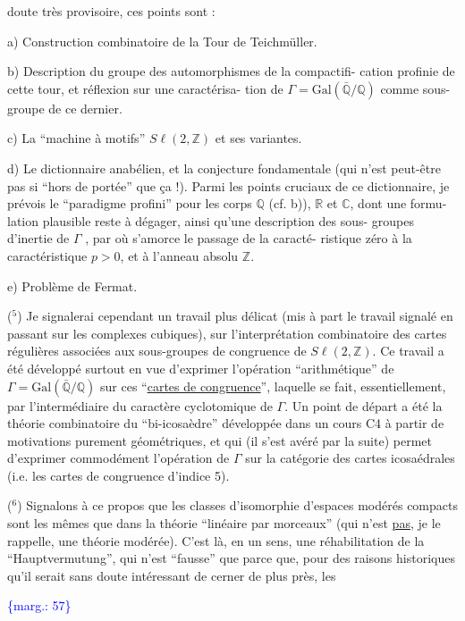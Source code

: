\documentclass[11pt]{article}
\newcommand{\scanpage}[1]{\par\bigskip\noindent{\small\sffamily[scan #1]}\par}
\newcommand{\mspage}[1]{{\small\sffamily[p.\,#1]}}
\newcommand{\margin}[1]{\textcolor{blue}{\{\textsf{marg.:} #1\}}}
\newcommand{\uline}[1]{\underline{#1}}
\begin{document}
doute très provisoire, ces points sont :

a) Construction combinatoire de la Tour de Teichmüller.

b) Description du groupe des automorphismes de la compactifi-%
cation profinie de cette tour, et réflexion sur une caractérisa-%
tion de $\Gamma = \mathrm{Gal}(\bar{\mathbb{Q}}/\mathbb{Q})$ comme sous-groupe de ce dernier.

c) La ``machine à motifs'' $S\ell(2,\mathbb{Z})$ et ses variantes.

d) Le dictionnaire anabélien, et la conjecture fondamentale
(qui n'est peut-être pas si ``hors de portée'' que ça !). Parmi
les points cruciaux de ce dictionnaire, je prévois le ``paradigme
profini'' pour les corps $\mathbb{Q}$ (cf. b)), $\mathbb{R}$ et $\mathbb{C}$, dont une formu-%
lation plausible reste à dégager, ainsi qu'une description des sous-%
groupes d'inertie de $\Gamma$ , par où s'amorce le passage de la caracté-%
ristique zéro à la caractéristique $p > 0$, et à l'anneau absolu $\mathbb{Z}$.

e) Problème de Fermat.

($^5$) Je signalerai cependant un travail plus délicat (mis à part
le travail signalé en passant sur les complexes cubiques), sur
l'interprétation combinatoire des cartes régulières associées aux
sous-groupes de congruence de $S\ell(2,\mathbb{Z})$. Ce travail a été développé
surtout en vue d'exprimer l'opération ``arithmétique'' de $\Gamma = \mathrm{Gal}(\bar{\mathbb{Q}}/\mathbb{Q})$
sur ces ``\uline{cartes de congruence}'', laquelle se fait, essentiellement,
par l'intermédiaire du caractère cyclotomique de $\Gamma$. Un point de
départ a été la théorie combinatoire du ``bi-icosaèdre'' développée
dans un cours C4 à partir de motivations purement géométriques,
et qui (il s'est avéré par la suite) permet d'exprimer commodément
l'opération de $\Gamma$ sur la catégorie des cartes icosaédrales (i.e.
les cartes de congruence d'indice 5).

($^6$) Signalons à ce propos que les classes d'isomorphie d'espaces
modérés compacts sont les mêmes que dans la théorie ``linéaire par
morceaux'' (qui n'est \uline{pas}, je le rappelle, une théorie modérée).
C'est là, en un sens, une réhabilitation de la ``Hauptvermutung'',
qui n'est ``fausse'' que parce que, pour des raisons historiques
qu'il serait sans doute intéressant de cerner de plus près, les

\margin{57}

\clearpage
\scanpage{119/58}
\mspage{56}
\end{document}

